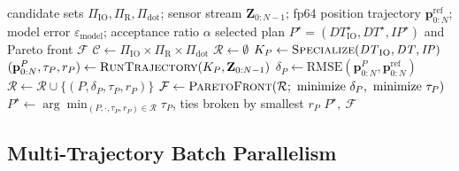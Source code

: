 \begin{algorithm}[H]
  \caption{Component-Aware Precision Plan Selection}
  \label{alg:precision-selection}
  \begin{algorithmic}[1]
    \Require
      candidate sets $\Pi_{\mathrm{IO}},\Pi_{\mathrm{R}},\Pi_{\mathrm{dot}}$;
      sensor stream $\mathbf{Z}_{0:N-1}$;
      fp64 position trajectory $\mathbf{p}^{\mathrm{ref}}_{0:N}$;
      model error $\varepsilon_{\mathrm{model}}$;
      acceptance ratio $\alpha$
    \Ensure
      selected plan
      $P^{\star}=(\mathit{DT}_{\mathrm{IO}}^{\star},\mathit{DT}^{\star},\mathit{IP}^{\star})$
      and Pareto front $\mathcal{F}$
    \State $\mathcal{C} \gets \Pi_{\mathrm{IO}} \times \Pi_{\mathrm{R}} \times \Pi_{\mathrm{dot}}$
    \State $\mathcal{R} \gets \emptyset$
      \State $K_{P} \gets \textsc{Specialize}(\mathit{DT}_{\mathrm{IO}},\mathit{DT},\mathit{IP})$
      \State $(\mathbf{p}^{P}_{0:N},\tau_{P},r_{P}) \gets \textsc{RunTrajectory}(K_{P},\mathbf{Z}_{0:N-1})$
      \State $\delta_{P} \gets \mathrm{RMSE}(\mathbf{p}^{P}_{0:N},\mathbf{p}^{\mathrm{ref}}_{0:N})$
        \State $\mathcal{R} \gets \mathcal{R}\cup\{(P,\delta_{P},\tau_{P},r_{P})\}$
      \EndIf
    \EndFor
    \State $\mathcal{F} \gets \textsc{ParetoFront}(\mathcal{R};\ \text{minimize}\ \delta_{P},\ \text{minimize}\ \tau_{P})$
    \State $P^{\star} \gets \arg\min_{(P,\cdot,\tau_{P},r_{P})\in\mathcal{R}} \tau_{P}$,
      ties broken by smallest $r_{P}$
    \State \Return $P^{\star},\ \mathcal{F}$
  \end{algorithmic}
\end{algorithm}

\subsection{Multi-Trajectory Batch Parallelism}
\label{subsec:batch-parallelism}


